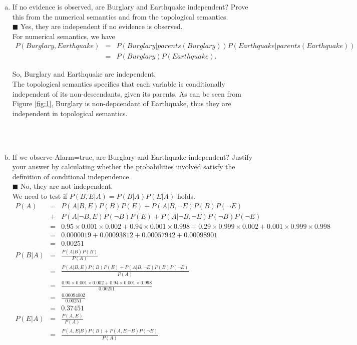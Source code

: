 \documentclass{article}
\newcommand{\solution}[1]{~\\ $\blacksquare$ \sffamily\upshape\selectfont #1
\normalfont ~\\~ }
\begin{document}
\begin{enumerate}[a.]
\item If no evidence is observed, are Burglary and Earthquake
independent? Prove this from the numerical semantics and from the
topological semantics.
\solution{Yes, they are independent if no evidence is observed. \\ 
For numerical semantics, we have 
\begin{eqnarray*}
  P(Burglary, Earthquake) & = &
  P(Burglary|parents(Burglary))P(Earthquake|parents(Earthquake))  \\
  & = & P(Burglary)P(Earthquake). 
\end{eqnarray*}

So, Burglary and Earthquake are independent. \\
The topological semantics specifies that each variable is
conditionally independent of its non-descendants, given its
parents. As can be seen from Figure \ref{fig:1}, Burglary is
non-depcendant of Earthquake, thus they are independent in
topological semantics. 
}
\item If we observe Alarm=true, are Burglary and Earthquake
independent? Justify your answer by calculating whether the
probabilities involved satisfy the definition of conditional
independence.
\solution{No, they are not independent. \\
We need to test if $P(B,E|A) = P(B|A)P(E|A)$ holds. 
\begin{eqnarray*}
P(A) & = & P(A|B,E)P(B)P(E) + P(A|B,\neg E)P(B)P(\neg E) \\ 
& + & P(A|\neg B,E)P(\neg B)P(E) + P(A|\neg B,\neg E)P(\neg B)P(\neg E) \\ 
& = & 0.95\times 0.001\times 0.002 + 0.94\times 0.001\times 0.998 +
0.29\times 0.999\times 0.002 + 0.001\times 0.999 \times 0.998 \\ 
& = & 0.0000019 + 0.00093812 + 0.00057942 + 0.00098901 \\
& = & 0.00251 \\
P(B|A) & = & \frac{P(A|B)P(B)}{P(A)} \\
& = & \frac{P(A|B,E)P(B)P(E)+P(A|B,\neg E)P(B)P(\neg E)}{P(A)} \\
& = & \frac{0.95\times 0.001\times 0.002 + 0.94\times 0.001\times
  0.998}{0.00251}\\ 
& = & \frac{0.00094002}{0.00251} \\ 
& = & 0.37451 \\
P(E|A) & = & \frac{P(A,E)}{P(A)} \\ 
& = & \frac{P(A,E|B)P(B)+P(A,E|\neg B)P(\neg B)}{P(A)} \\

\end{eqnarray*}}
\end{enumerate}
\end{document}
